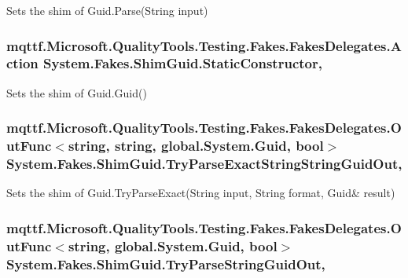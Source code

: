 Sets the shim of Guid.\-Parse(\-String input)

\hypertarget{class_system_1_1_fakes_1_1_shim_guid_a44ddc6f53d83a8c5921a0796efc8e482}{
\subsubsection[{Static\-Constructor}]{\setlength{\rightskip}{0pt plus 5cm}mqttf.\-Microsoft.\-Quality\-Tools.\-Testing.\-Fakes.\-Fakes\-Delegates.\-Action System.\-Fakes.\-Shim\-Guid.\-Static\-Constructor\hspace{0.3cm}{\ttfamily [static]}, {\ttfamily [set]}}}\label{class_system_1_1_fakes_1_1_shim_guid_a44ddc6f53d83a8c5921a0796efc8e482}


Sets the shim of Guid.\-Guid()

\hypertarget{class_system_1_1_fakes_1_1_shim_guid_ae0756d6709d6eeb2a70048c30df1d162}{
\subsubsection[{Try\-Parse\-Exact\-String\-String\-Guid\-Out}]{\setlength{\rightskip}{0pt plus 5cm}mqttf.\-Microsoft.\-Quality\-Tools.\-Testing.\-Fakes.\-Fakes\-Delegates.\-Out\-Func$<$string, string, global.\-System.\-Guid, bool$>$ System.\-Fakes.\-Shim\-Guid.\-Try\-Parse\-Exact\-String\-String\-Guid\-Out\hspace{0.3cm}{\ttfamily [static]}, {\ttfamily [set]}}}\label{class_system_1_1_fakes_1_1_shim_guid_ae0756d6709d6eeb2a70048c30df1d162}


Sets the shim of Guid.\-Try\-Parse\-Exact(String input, String format, Guid\& result)

\hypertarget{class_system_1_1_fakes_1_1_shim_guid_a869ffb96b203467d49005557e1ac6788}{
\subsubsection[{Try\-Parse\-String\-Guid\-Out}]{\setlength{\rightskip}{0pt plus 5cm}mqttf.\-Microsoft.\-Quality\-Tools.\-Testing.\-Fakes.\-Fakes\-Delegates.\-Out\-Func$<$string, global.\-System.\-Guid, bool$>$ System.\-Fakes.\-Shim\-Guid.\-Try\-Parse\-String\-Guid\-Out\hspace{0.3cm}{\ttfamily [static]}, {\ttfamily [set]}}}\label{class_system_1_1_fakes_1_1_shim_guid_a869ffb96b203467d49005557e1ac6788}


